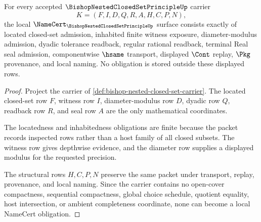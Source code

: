 \begin{theorem}
\label{thm:bishop-nested-closed-set-namecert-obligations}
For every accepted $\BishopNestedClosedSetPrincipleUp$ carrier
$$
K=(F,I,D,Q,R,A,H,C,P,N),
$$
the local $\NameCert_{\BishopNestedClosedSetPrincipleUp}$ surface consists exactly of located closed-set admission, inhabited finite witness exposure, diameter-modulus admission, dyadic tolerance readback, regular rational readback, terminal Real seal admission, componentwise $\hsame$ transport, displayed $\Cont$ replay, $\Pkg$ provenance, and local naming. No obligation is stored outside these displayed rows.
\end{theorem}
\begin{proof}
Project the carrier of \autoref{def:bishop-nested-closed-set-carrier}. The located closed-set row $F$, witness row $I$, diameter-modulus row $D$, dyadic row $Q$, readback row $R$, and seal row $A$ are the only mathematical coordinates.

The locatedness and inhabitedness obligations are finite because the packet records inspected rows rather than a host family of all closed subsets. The witness row gives depthwise evidence, and the diameter row supplies a displayed modulus for the requested precision.

The structural rows $H,C,P,N$ preserve the same packet under transport, replay, provenance, and local naming. Since the carrier contains no open-cover compactness, sequential compactness, global choice schedule, quotient equality, host intersection, or ambient completeness coordinate, none can become a local NameCert obligation.
\end{proof}

